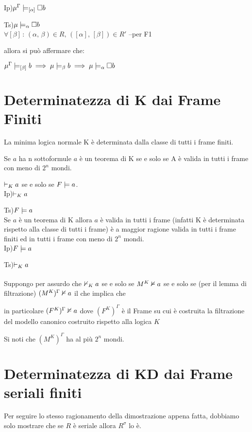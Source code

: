 Ip)$\mu^{\Gamma}\models_{[\alpha]}\square b$

Ts)$\mu\models_{\alpha}\square b$\\


$\forall[\beta]\,:\,(\alpha,\,\beta)\in R,\,([\alpha],\,[\beta])\in R'$
--per F1

allora si può affermare che:

$\mu^{\Gamma}\models_{[\beta]}b\implies\mu\models_{\beta}b\implies\mu\models_{\alpha}\square b$


\section{Determinatezza di K dai Frame Finiti}

La minima logica normale K è determinata dalla classe di tutti i frame
finiti.

Se $a$ ha n sottoformule $a$ è un teorema di K se e solo se A è
valida in tutti i frame con meno di $2^{n}$ mondi. 

$\vdash_{K}a$ se e solo se $F\models a$.\\


Ip)$\vdash_{K}a$ 

Ts)$F\models a$\\


Se $a$ è un teorema di K allora $a$ è valida in tutti i frame (infatti
K è determinata rispetto alla classe di tutti i frame) è a maggior
ragione valida in tutti i frame finiti ed in tutti i frame con meno
di $2^{n}$ mondi.\\


Ip)$F\models a$

Ts)$\vdash_{K}a$\\
\\
Suppongo per assurdo che $\nvdash_{K}a$ se e solo se $M^{K}\nvDash a$
se e solo se (per il lemma di filtrazione) $(M^{K})^{\Gamma}\nvDash a$
il che implica che

in particolare $(F^{K})^{\Gamma}\nvDash a$ dove $(F^{K})^{\Gamma}$
è il Frame su cui è costruita la filtrazione del modello canonico
costruito rispetto alla logica $K$ 

Si noti che $(M^{K})^{\Gamma}$ ha al più $2^{n}$ mondi.


\section{Determinatezza di KD dai Frame seriali finiti}

Per seguire lo stesso ragionamento della dimostrazione appena fatta,
dobbiamo solo mostrare che se $R$ è seriale allora $R^{\sigma}$
lo è.\\


